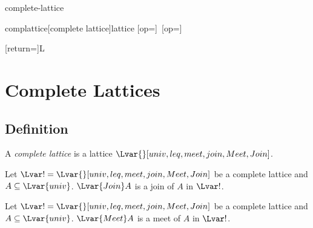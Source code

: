 \documentclass{stex}
\begin{document}
\begin{smodule}{complete-lattice}

  \STEXexport{
    \let\Join\relax
  }

  \begin{extstructure}{complattice}[complete lattice]{lattice}
    [op=\bigvee]{\bigvee\,}
    [op=\bigwedge]{\bigwedge\,}
  \end{extstructure}

  [return={\complattice[comp=##1]}]{\mathcal L}

  \section{Complete Lattices}

  \begin{forthel}
  \end{forthel}
  
  \subsection{Definition}

  \begin{forthel}
    \begin{signature*}
      A \emph{complete lattice} is a lattice $\Lvar{}[univ,leq,meet,join,Meet,Join]$.
    \end{signature*}
  \end{forthel}
  
  \begin{forthel}
    \begin{signature*}
      Let $\Lvar! = \Lvar{}[univ,leq,meet,join,Meet,Join]$ be a complete lattice and $A \subseteq \Lvar{univ}$.
      ${\Lvar{Join}} A$ is a join of $A$ in $\Lvar!$.
    \end{signature*}
  \end{forthel}

  \begin{forthel}
    \begin{signature*}
      Let $\Lvar! = \Lvar{}[univ,leq,meet,join,Meet,Join]$ be a complete lattice and $A \subseteq \Lvar{univ}$.
      ${\Lvar{Meet}} A$ is a meet of $A$ in $\Lvar!$.
    \end{signature*}
  \end{forthel}


\end{smodule}
\end{document}
